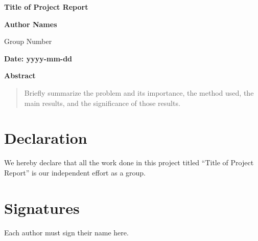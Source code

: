 \documentclass[UTF8,a4paper,11pt,twoside]{ctexart}
\theoremstyle{definition}
\newcommand{\ProjectTitle}{Title of Project Report}
\newcommand{\GroupNumber}{Group Number}
\newcommand{\StudentNames}{Author Names}
\newcommand{\ProjectDate}{yyyy-mm-dd}
\renewenvironment{abstract}{%
  \begin{center}
    {\bfseries\fontsize{14pt}{17pt}\selectfont Abstract\par}
  \end{center}
  \begin{quotation}\normalsize
}{%
  \end{quotation}
}
\begin{document}
\begin{center}
  \vspace*{0.3cm}
  {\titlefont\bfseries\fontsize{20pt}{25pt}\selectfont
    \ProjectTitle\par}

  \vspace{1.2cm}
  {\titlefont\bfseries\fontsize{13pt}{17pt}\selectfont
    \StudentNames\par}

  \vspace{0.25cm}
  {\titlefont\fontsize{11pt}{14pt}\selectfont
    \GroupNumber\par}

  \vspace{0.9cm}
  {\titlefont\bfseries\fontsize{12pt}{15pt}\selectfont
    Date: \ProjectDate\par}
\end{center}

\vspace{0.8cm}

\begin{abstract}
Briefly summarize the problem and its importance, the method used, the main
results, and the significance of those results.
\end{abstract}

\clearpage
\tableofcontents
\clearpage







\section*{Declaration}
We hereby declare that all the work done in this project titled
``\ProjectTitle'' is our independent effort as a group.

\section*{Signatures}
Each author must sign their name here.

\vspace{3cm}




\appendix

\end{document}

